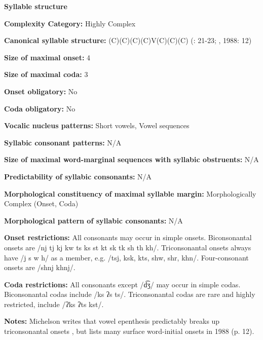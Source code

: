 \textbf{Syllable structure}



\textbf{Complexity Category:} Highly Complex



\textbf{Canonical syllable structure:} (C)(C)(C)(C)V(C)(C)(C) (\citealt{Bonvillain1973}: 21-23; \citealt{Michelson1981}, 1988: 12)



\textbf{Size of maximal onset:} 4



\textbf{Size of maximal coda:} 3



\textbf{Onset obligatory:} No



\textbf{Coda obligatory:} No



\textbf{Vocalic nucleus patterns:} Short vowels, Vowel sequences



\textbf{Syllabic consonant patterns:} N/A



\textbf{Size of maximal word{}-marginal sequences with syllabic obstruents:} N/A



\textbf{Predictability of syllabic consonants:} N/A



\textbf{Morphological constituency of maximal syllable margin:} Morphologically Complex (Onset, Coda)



\textbf{Morphological pattern of syllabic consonants:} N/A



\textbf{Onset restrictions:} All consonants may occur in simple onsets. Biconsonantal onsets are /nj tj kj kw ts ks st kt sk tk sh th kh/. Triconsonantal onsets always have /j s w h/ as a member, e.g. /tsj, ksk, kts, shw, shr, khn/. Four-consonant onsets are /shnj khnj/.



\textbf{Coda restrictions:} All consonants except /d͡ʒ/ may occur in simple codas. Biconsonantal codas include /ks ʔs ts/. Triconsonantal codas are rare and highly restricted, include /ʔks ʔts kst/.



\textbf{Notes:} Michelson writes that vowel epenthesis predictably breaks up triconsonantal onsets , but lists many surface word-initial onsets in 1988 (p. 12).



